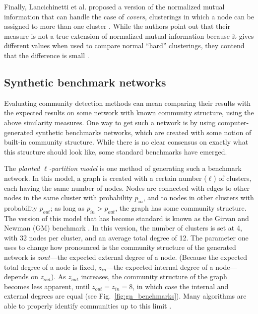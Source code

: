 Finally, Lancichinetti et al. proposed a version of the normalized
mutual information that can handle the case of \emph{covers},
clusterings in which a node can be assigned to more than one cluster
\autocite{lancichinetti_detecting_2009}. While the authors point out
that their measure is not a true extension of normalized mutual
information because it gives different values when used to compare
normal ``hard'' clusterings, they contend that the difference is small
\autocite{lancichinetti_community_2009}.

\hypertarget{synthetic-benchmark-networks}{\subsection{Synthetic
benchmark networks}\label{synthetic-benchmark-networks}}

Evaluating community detection methods can mean comparing their results
with the expected results on some network with known community
structure, using the above similarity measures. One way to get such a
network is by using computer-generated synthetic benchmarks networks,
which are created with some notion of built-in community structure.
While there is no clear consensus on exactly what this structure should
look like, some standard benchmarks have emerged.

The \emph{planted \(\ell\)-partition model} is one method of generating
such a benchmark network. In this model, a graph is created with a
certain number (\(\ell\)) of clusters, each having the same number of
nodes. Nodes are connected with edges to other nodes in the same cluster
with probability \(p_{in}\), and to nodes in other clusters with
probability \(p_{out}\); as long as \(p_{in} > p_{out}\), the graph has
some community structure. The version of this model that has become
standard is known as the Girvan and Newman (GM) benchmark
\autocite{girvan_community_2002}. In this version, the number of
clusters is set at 4, with 32 nodes per cluster, and an average total
degree of 12. The parameter one uses to change how pronounced is the
community structure of the generated network is \(z{out}\)---the
expected external degree of a node. (Because the expected total degree
of a node is fixed, \(z_{in}\)---the expected internal degree of a
node---depends on \(z_{out}\)). As \(z_{out}\) increases, the community
structure of the graph becomes less apparent, until
\(z_{out} = z_{in} = 8\), in which case the internal and external
degrees are equal (see Fig.~\ref{fig:gn_benchmarks}). Many algorithms
are able to properly identify communities up to this limit
\autocite{fortunato_community_2010}.

